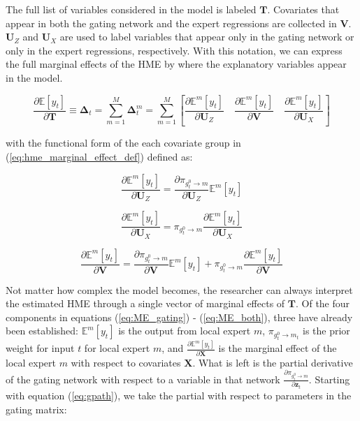 \documentclass[12pt]{article}
\newcommand{\gateprod}[2]{\pi_{#1 \longrightarrow #2}}
\newcommand{\Eym}{\mathbb{E}^{m} \left[ y_{t} \right]}
\begin{document}
The full list of variables considered in the model is labeled $\boldsymbol{T}$.
Covariates that appear in both the gating network and the expert regressions
are collected in $\boldsymbol{V}$. $\boldsymbol{U}_{Z}$ and $\boldsymbol{U}_{X}$ are
used to label variables that appear only in the gating network or only in the expert
regressions, respectively. With this notation, we can express the full marginal effects
of the HME by where the explanatory variables appear in the model.

\begin{equation} \label{eq:hme_marginal_effect_def}
  \frac{\partial \mathbb{E} \left[y_{t}\right]}{\partial \boldsymbol{T}} \equiv \boldsymbol{\Delta}_{t} = \sum_{m=1}^{M} \boldsymbol{\Delta}^{m}_{t} = \sum_{m=1}^{M} \left[ \frac{\partial \Eym}{\partial \boldsymbol{U}_{Z}}   \quad   \frac{\partial \Eym}{\partial \boldsymbol{V}}   \quad   \frac{\partial \Eym}{\partial \boldsymbol{U}_{X}}   \right]
\end{equation}

with the functional form of the each covariate group in (\ref{eq:hme_marginal_effect_def})
defined as:

\begin{equation} \label{eq:ME_gating}
  \frac{\partial \Eym}{\partial \boldsymbol{U}_{Z}} = \frac{\partial \gateprod{g^{0}_{t}}{m}}{{\partial \boldsymbol{U}_{Z}}} \Eym
\end{equation}


\begin{equation} \label{eq:ME_expert}
  \frac{\partial \Eym}{\partial \boldsymbol{U}_{X}} = \gateprod{g^{0}_{t}}{m} \frac{\partial \Eym}{{\partial \boldsymbol{U}_{X}}}
\end{equation}


\begin{equation} \label{eq:ME_both}
  \frac{\partial \Eym}{\partial \boldsymbol{V}} = \frac{\partial \gateprod{g^{0}_{t}}{m}}{{\partial \boldsymbol{V}}} \Eym + \gateprod{g^{0}_{t}}{m} \frac{\partial \Eym}{{\partial \boldsymbol{V}}}
\end{equation}

Not matter how complex the model becomes, the researcher can always interpret
the estimated HME through a single vector of marginal effects of $\boldsymbol{T}$.
Of the four components in equations (\ref{eq:ME_gating}) - (\ref{eq:ME_both}),
three have already been established: $\Eym$ is the output from local
expert $m$, $\gateprod{g^{0}_{t}}{m_{t}}$ is the prior weight for
input $t$ for local expert $m$, and $\frac{\partial \Eym}{{\partial \boldsymbol{X}}}$
is the marginal effect of the local expert $m$ with respect to covariates $\boldsymbol{X}$.
What is left is the partial derivative of the gating network with respect to a
variable in that network $\frac{\partial \gateprod{g^{0}_{t}}{m}}{\partial \boldsymbol{z}_{t}}$.
Starting with equation (\ref{eq:gpath}), we take the partial with
respect to parameters in the gating matrix:
\end{document}
